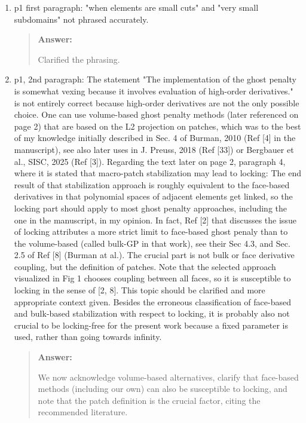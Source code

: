 \documentclass[11pt, a4paper]{article}
\newenvironment{answer}{%
      \begin{quote}%
            \color{blue!80!black}%
            \textbf{Answer:}%
            }{%
      \end{quote}%
}
\begin{document}
\begin{enumerate}[label=\textbullet, wide, labelindent=0pt]
      \item p1 first paragraph: "when elements are small cuts" and "very small subdomains" not phrased accurately.
            \begin{answer}
                  Clarified the phrasing.
            \end{answer}

      \item p1, 2nd paragraph: The statement "The implementation of the ghost penalty is somewhat vexing because it
            involves evaluation of high-order derivatives." is not entirely correct because high-order derivatives are
            not the only
            possible choice. One can use volume-based ghost penalty methods (later referenced on page 2) that are based
            on the L2
            projection on patches, which was to the best of my knowledge initially described in Sec. 4 of Burman, 2010
            (Ref [4] in
            the manuscript), see also later uses in J. Preuss, 2018 (Ref [33]) or Bergbauer et al., SISC, 2025 (Ref
                  [3]). Regarding
            the text later on page 2, paragraph 4, where it is stated that macro-patch stabilization may lead to
            locking: The end
            result of that stabilization approach is roughly equivalent to the face-based derivatives in that
            polynomial spaces of
            adjacent elements get linked, so the locking part should apply to most ghost penalty approaches, including
            the one in
            the manuscript, in my opinion. In fact, Ref [2] that discusses the issue of locking attributes a more
            strict limit to
            face-based ghost penaly than to the volume-based (called bulk-GP in that work), see their Sec 4.3, and Sec.
            2.5 of Ref
                  [8] (Burman at al.). The crucial part is not bulk or face derivative coupling, but the definition of
            patches. Note that
            the selected approach visualized in Fig 1 chooses coupling between all faces, so it is susceptible to
            locking in the
            sense of [2, 8]. This topic should be clarified and more appropriate context given. Besides the erroneous
            classification of face-based and bulk-based stabilization with respect to locking, it is probably also not
            crucial to
            be locking-free for the present work because a fixed parameter is used, rather than going towards infinity.
            \begin{answer}
                  We now acknowledge volume-based alternatives, clarify that face-based methods (including our own) can
                  also be susceptible to locking, and note that the patch definition is the crucial factor, citing the
                  recommended
                  literature.
            \end{answer}


\end{enumerate}
\end{document}
